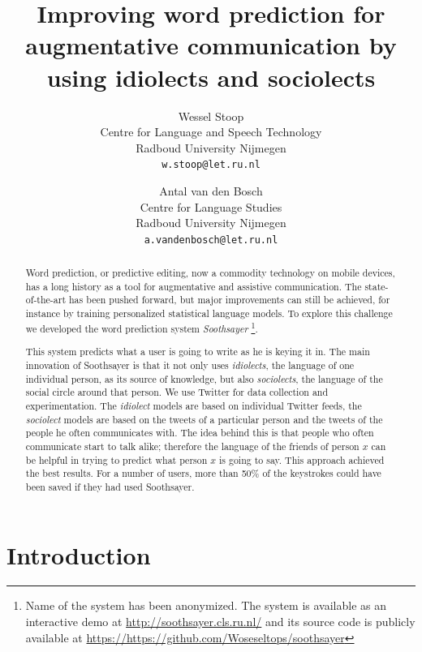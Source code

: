 \documentclass[12pt]{article}
\title{Improving word prediction for augmentative communication by using idiolects and sociolects}
\author{
Wessel Stoop\vspace{-2ex}\\
Centre for Language and Speech Technology\vspace{-2ex}\\
Radboud University Nijmegen\vspace{-2ex} \\
  {\tt w.stoop@let.ru.nl} \\
  \and
  Antal van den Bosch \vspace{-2ex}\\
Centre for Language Studies \vspace{-2ex}\\
Radboud University Nijmegen \vspace{-2ex}\\
  {\tt a.vandenbosch@let.ru.nl} \vspace{-2ex}\\
}
\date{}
\begin{document}
\maketitle

\begin{abstract}
Word prediction, or predictive editing, now a commodity technology on mobile devices, has a long history as a tool for augmentative and assistive communication. The state-of-the-art has been pushed forward, but major improvements can still be achieved, for instance by training personalized statistical language models.
To explore this challenge we developed the word prediction system \emph{Soothsayer}
\footnote{Name of the system has been anonymized. The system is available as an interactive demo at \url{http://soothsayer.cls.ru.nl/} and its source code is publicly available at \url{https://https://github.com/Woseseltops/soothsayer}}. 

This system predicts what a user is going to write as he is keying it in. The main innovation of Soothsayer is that it not only uses \emph{idiolects}, the language of one individual person, as its source of knowledge, but also \emph{sociolects}, the language of the social circle around that person. We use Twitter for data collection and experimentation. The \emph{idiolect}\/ models are based on individual Twitter feeds, the \emph{sociolect}\/ models are based on the tweets of a particular person and the tweets of the people he often communicates with. The idea behind this is that people who often communicate start to talk alike; therefore the language of the friends of person $x$ can be helpful in trying to predict what person $x$ is going to say. This approach achieved the best results. For a number of users, more than 50\% of the keystrokes could have been saved if they had used Soothsayer. 
\end{abstract}

\section{Introduction} \label{intro}
\end{document}
